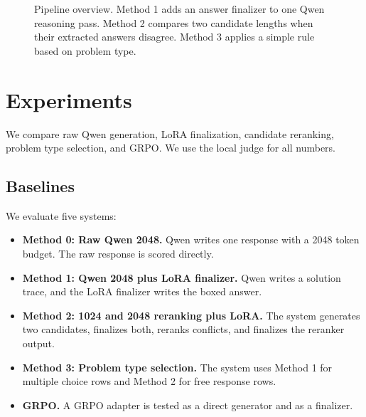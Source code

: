 \documentclass[11pt]{article}
\begin{document}
\begin{figure}[H]
\centering
{}
\caption{Pipeline overview. Method 1 adds an answer finalizer to one Qwen reasoning pass. Method 2 compares two candidate lengths when their extracted answers disagree. Method 3 applies a simple rule based on problem type.}
\label{fig:pipeline}
\end{figure}

\section{Experiments}
\label{sec:experiments}

We compare raw Qwen generation, LoRA finalization, candidate reranking, problem type selection, and GRPO. We use the local judge for all numbers.

\subsection{Baselines}
\label{sec:baselines}

We evaluate five systems:
\begin{itemize}
  \item \textbf{Method 0: Raw Qwen 2048.} Qwen writes one response with a 2048 token budget. The raw response is scored directly.
  \item \textbf{Method 1: Qwen 2048 plus LoRA finalizer.} Qwen writes a solution trace, and the LoRA finalizer writes the boxed answer.
  \item \textbf{Method 2: 1024 and 2048 reranking plus LoRA.} The system generates two candidates, finalizes both, reranks conflicts, and finalizes the reranker output.
  \item \textbf{Method 3: Problem type selection.} The system uses Method 1 for multiple choice rows and Method 2 for free response rows.
  \item \textbf{GRPO.} A GRPO adapter is tested as a direct generator and as a finalizer.
\end{itemize}
\end{document}
